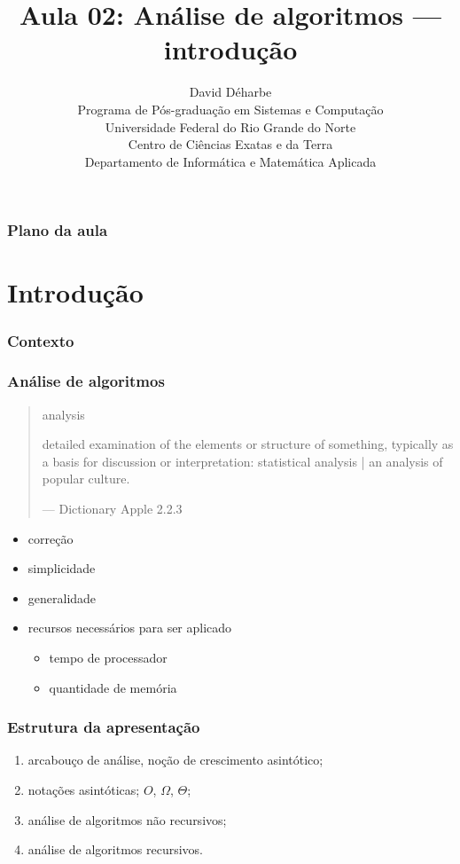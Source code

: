 \documentclass{beamer}
\title{Aula 02: Análise de algoritmos --- introdução}
\author{David Déharbe \\
  Programa de Pós-graduação em Sistemas e Computação \\
  Universidade Federal do Rio Grande do Norte \\
  Centro de Ciências Exatas e da Terra \\
  Departamento de Informática e Matemática Aplicada}
\date{}
\begin{document}
\begin{frame}
  \titlepage
\end{frame}

\begin{frame}
  \frametitle{Plano da aula}
  \tableofcontents
\end{frame}

\section{Introdução}

\begin{frame}

  \frametitle{Contexto}

  \begin{center}
  
  \end{center}
\end{frame}

\begin{frame}

  \frametitle{Análise de algoritmos}

  \begin{quote}

    analysis

    detailed examination of the elements or structure of something, typically as
    a basis for discussion or interpretation: statistical analysis | an analysis
    of popular culture.

    --- Dictionary Apple 2.2.3
  \end{quote}
  \pause
  \begin{itemize}
  \item correção
  \item simplicidade
  \item generalidade
  \item recursos necessários para ser aplicado 

    \begin{itemize}
    \item tempo de processador
    \item quantidade de memória
    \end{itemize}
  \end{itemize}
\end{frame}

\begin{frame}

  \frametitle{Estrutura da apresentação}

  \begin{enumerate}
  \item arcabouço de análise, noção de crescimento asintótico;
  \item notações asintóticas; $O$, $\Omega$, $\Theta$;
  \item análise de algoritmos não recursivos;
  \item análise de algoritmos recursivos.
  \end{enumerate}

\end{frame}
\end{document}
